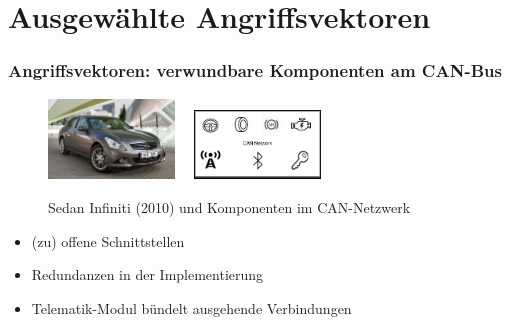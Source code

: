 \documentclass[t]{beamer}
\begin{document}
\section{Ausgewählte Angriffsvektoren} %
\begin{frame}
	\frametitle{Angriffsvektoren: verwundbare Komponenten am CAN-Bus}
    \begin{center}
    	\begin{figure}
			\includegraphics[width=0.3\textwidth]{pic/remote_attack_images-026.jpg} \ \
			\includegraphics[width=0.3\textwidth]{pic/remote_attack_images-027.jpg}
      	  	\caption[2010 Infiniti G37 (Sedan)]{Sedan Infiniti (2010) und Komponenten im CAN-Netzwerk}
			\cite{Quellen}
		\end{figure}
	\end{center}
	\begin{itemize}
		\item (zu) offene Schnittstellen
  	    \item Redundanzen in der Implementierung
        \item Telematik-Modul bündelt ausgehende Verbindungen
	\end{itemize}
\end{frame}
\end{document}
